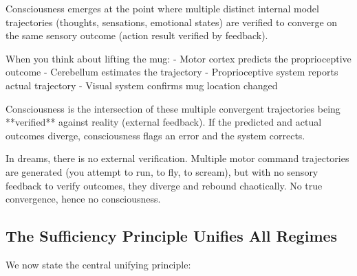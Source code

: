 \begin{corollary}
\label{cor:consciousness-convergence}
Consciousness emerges at the point where multiple distinct internal model trajectories (thoughts, sensations, emotional states) are verified to converge on the same sensory outcome (action result verified by feedback).

When you think about lifting the mug:
- Motor cortex predicts the proprioceptive outcome
- Cerebellum estimates the trajectory
- Proprioceptive system reports actual trajectory
- Visual system confirms mug location changed

Consciousness is the intersection of these multiple convergent trajectories being **verified** against reality (external feedback). If the predicted and actual outcomes diverge, consciousness flags an error and the system corrects.

In dreams, there is no external verification. Multiple motor command trajectories are generated (you attempt to run, to fly, to scream), but with no sensory feedback to verify outcomes, they diverge and rebound chaotically. No true convergence, hence no consciousness.
\end{corollary}

\subsection{The Sufficiency Principle Unifies All Regimes}
\label{subsec:sufficiency-unification}

We now state the central unifying principle:

